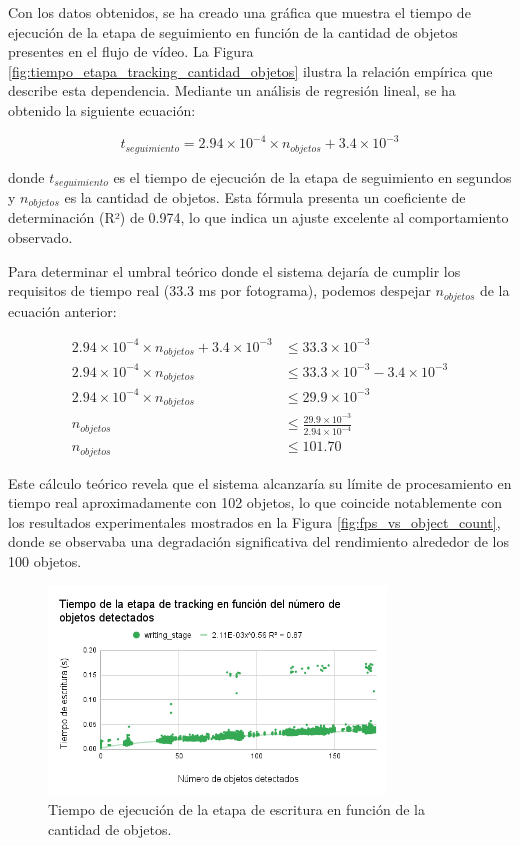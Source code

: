 \documentclass[11pt,spanish,listoffigures,listoftables]{tfgetsinf}
\begin{document}
Con los datos obtenidos, se ha creado una gráfica que muestra el tiempo de ejecución de la etapa de seguimiento en función de la cantidad de objetos presentes en el flujo de vídeo. La Figura \ref{fig:tiempo_etapa_tracking_cantidad_objetos} ilustra la relación empírica que describe esta dependencia. Mediante un análisis de regresión lineal, se ha obtenido la siguiente ecuación:

\begin{equation}
t_{seguimiento} = 2.94 \times 10^{-4} \times n_{objetos} + 3.4 \times 10^{-3}
\end{equation}

donde $t_{seguimiento}$ es el tiempo de ejecución de la etapa de seguimiento en segundos y $n_{objetos}$ es la cantidad de objetos. Esta fórmula presenta un coeficiente de determinación (R²) de 0.974, lo que indica un ajuste excelente al comportamiento observado.

Para determinar el umbral teórico donde el sistema dejaría de cumplir los requisitos de tiempo real (33.3 ms por fotograma), podemos despejar $n_{objetos}$ de la ecuación anterior:

\begin{align}
   2.94 \times 10^{-4} \times n_{objetos} + 3.4 \times 10^{-3} &\leq 33.3 \times 10^{-3} \\
   2.94 \times 10^{-4} \times n_{objetos} &\leq 33.3 \times 10^{-3} - 3.4 \times 10^{-3} \\
   2.94 \times 10^{-4} \times n_{objetos} &\leq 29.9 \times 10^{-3} \\
   n_{objetos} &\leq \frac{29.9 \times 10^{-3}}{2.94 \times 10^{-4}} \\
   n_{objetos} &\leq 101.70
\end{align}

Este cálculo teórico revela que el sistema alcanzaría su límite de procesamiento en tiempo real aproximadamente con 102 objetos, lo que coincide notablemente con los resultados experimentales mostrados en la Figura \ref{fig:fps_vs_object_count}, donde se observaba una degradación significativa del rendimiento alrededor de los 100 objetos.

\begin{figure}[H]
   \centering
   \includegraphics[width=0.8\textwidth]{images/analisis_de_la_solucion/cantidad_objetos/tiempo_etapa_escritura_cantidad_objetos.png}
   \caption[Tiempo de ejecución de la etapa de escritura en función de la cantidad de objetos]{Tiempo de ejecución de la etapa de escritura en función de la cantidad de objetos.}
   \label{fig:tiempo_etapa_escritura_cantidad_objetos}
\end{figure}
\end{document}
